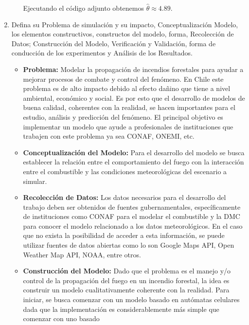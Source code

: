 \documentclass[12pt]{article}
\begin{document}
\begin{enumerate}
\begin{itemize}
            Ejecutando el código adjunto obtenemos $\hat{\theta} \approx 4.89$.                        
            
        \end{itemize}
      \item  Defina su Problema de simulación y su impacto, Conceptualización
        Modelo, los elementos constructivos, constructos del modelo, forma,
        Recolección de Datos; Construcción del Modelo, Verificación y Validación,
        forma de conducción de los experimentos y Análisis de los Resultados.

        \begin{itemize}
          \item \textbf{Problema:} Modelar la propagación de incendios forestales para ayudar a mejorar 
            procesos de combate y control del fenómeno. En Chile este problema es de alto impacto debido al 
            efecto dañino que tiene a nivel ambiental, económico y social. Es por esto que el desarrollo de 
            modelos de buena calidad, coherentes con la realidad, se hacen importantes para el estudio, análisis 
            y predicción del fenómeno. El principal objetivo es implementar un modelo que ayude a profesionales 
            de instituciones que trabajen con este problema ya sea CONAF, ONEMI, etc.
          \item \textbf{Conceptualización del Modelo:} Para el desarrollo del modelo se busca establecer la 
            relación entre el comportamiento del fuego con la interacción entre el combustible y las condiciones
            meteorológicas del escenario a simular.
          \item \textbf{Recolección de Datos:} Los datos necesarios para el desarrollo del trabajo deben ser 
            obtenidos de fuentes gubernamentales, específicamente de instituciones como CONAF para el modelar
            el combustible y la DMC para conocer el modelo relacionado a los datos meteorológicos. En el caso
            que no exista la posibilidad de acceder a esta información, se puede utilizar fuentes de datos abiertas
            como lo son Google Maps API, Open Weather Map API, NOAA, entre otros.
          \item \textbf{Construcción del Modelo:} Dado que el problema es el manejo y/o control de la 
            propagación del fuego en un incendio forestal, la idea es construir un modelo cualitativamente 
            coherente con la realidad. Para iniciar, se busca comenzar con un modelo basado en autómatas 
            celulares dada que la implementación es considerablemente más simple que comenzar con uno basado

\end{itemize}
\end{enumerate}
\end{document}
